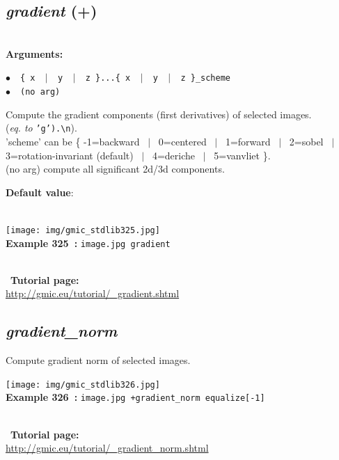 \documentclass[a4paper,10.5pt,twoside]{book}
\def\comma{\discretionary{,}{}{,}}
\newcommand{\Cb}[1]{\textcolor{cb}{#1}}
\newcommand{\Cc}[1]{\textcolor{cc}{#1}}
\begin{document}
\subsection{\emph{gradient} (+)}\vspace*{-0.7em}
~\\\textbf{\Cb{Arguments: }}\begin{flushleft}
{\small \Cb{\hspace*{0.5cm}$\bullet$~~\texttt{\{ x ~$|$~ y ~$|$~ z \}...\{ x ~$|$~ y ~$|$~ z \}{\comma}\_scheme}}}~~~\\
{\small \Cb{\hspace*{0.5cm}$\bullet$~~\texttt{(no arg)}}}\end{flushleft}
Compute the gradient components (first derivatives) of selected images.
~\\(\emph{eq. to} {\small \texttt{'g').\textbackslash n}}).
~\\'scheme' can be \{ -1=backward ~$|$~ 0=centered ~$|$~ 1=forward ~$|$~ 2=sobel ~$|$~ 3=rotation-invariant (default) ~$|$~ 4=deriche ~$|$~ 5=vanvliet \}.
~\\(no arg) compute all significant 2d/3d components.
\begin{flushleft}\Cc{\textbf{Default value}:\\~\\\hspace*{0.5cm}{\small $\bullet$~~\texttt{'scheme=3'.}}}\end{flushleft}
\begin{center}\texttt{[image: img/gmic\_stdlib325.jpg]}\\
{\footnotesize \textbf{Example 325~:} \texttt{image.jpg gradient}}
\end{center}
~\\
~\textbf{Tutorial page: }\\\url{http://gmic.eu/tutorial/\_gradient.shtml}


\subsection{\emph{gradient\_norm} }\vspace*{-0.7em}
Compute gradient norm of selected images.
\begin{center}\texttt{[image: img/gmic\_stdlib326.jpg]}\\
{\footnotesize \textbf{Example 326~:} \texttt{image.jpg +gradient\_norm equalize[-1]}}
\end{center}
~\\
~\textbf{Tutorial page: }\\\url{http://gmic.eu/tutorial/\_gradient\_norm.shtml}
\end{document}
